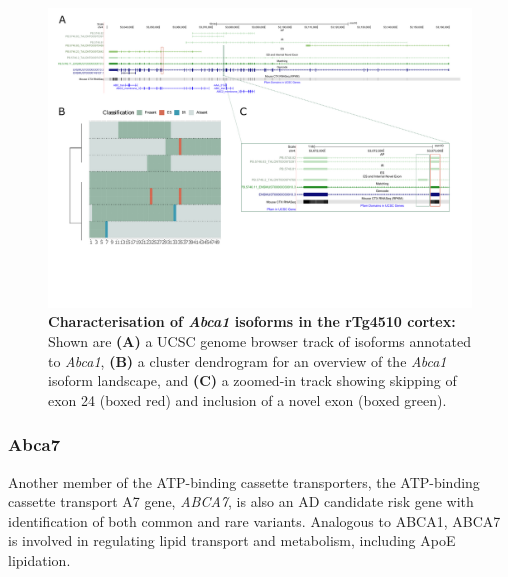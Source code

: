 \begin{landscape}
	\begin{figure}[htp]
		\centering
		\includegraphics[page=1,trim={0 4cm 0 0},scale = 0.85]{Figures/TargetGenes_Annotation_Landscape.pdf}
		\captionsetup{width=1.3\textwidth}
		\caption[Characterisation of \textit{Abca1} isoforms in the rTg4510 cortex]%
		{\textbf{Characterisation of \textit{Abca1} isoforms in the rTg4510 cortex:} Shown are \textbf{(A)} a UCSC genome browser track of isoforms annotated to \textit{Abca1}, \textbf{(B)} a cluster dendrogram for an overview of the \textit{Abca1} isoform landscape, and \textbf{(C)} a zoomed-in track showing skipping of exon 24 (boxed red) and inclusion of a novel exon (boxed green).}   
		\label{fig:abca1}
	\end{figure}
\end{landscape}
\restoregeometry

\newpage
\subsubsection{Abca7}
Another member of the ATP-binding cassette transporters, the ATP-binding cassette transport A7 gene, \textit{ABCA7}, is also an AD candidate risk gene with identification of both common and rare variants\cite{Steinberg2015,Cuyvers2015,Guennec2016}. Analogous to ABCA1, ABCA7 is involved in regulating lipid transport and metabolism, including ApoE lipidation\cite{DeRoeck2019a}. 

